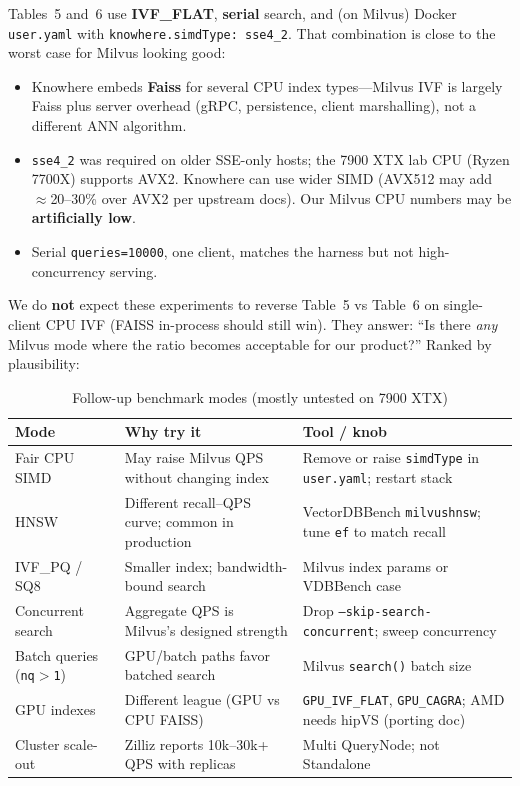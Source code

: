 \documentclass[11pt,a4paper]{article}
\begin{document}
Tables~5 and~6 use \textbf{IVF\_FLAT}, \textbf{serial} search, and (on Milvus) Docker
\texttt{user.yaml} with \texttt{knowhere.simdType: sse4\_2}. That combination is close to
the worst case for Milvus looking good:
\begin{itemize}[leftmargin=*]
  \item Knowhere embeds \textbf{Faiss} for several CPU index types---Milvus IVF is largely
        Faiss plus server overhead (gRPC, persistence, client marshalling), not a different
        ANN algorithm.
  \item \texttt{sse4\_2} was required on older SSE-only hosts; the 7900 XTX lab CPU (Ryzen
        7700X) supports AVX2. Knowhere can use wider SIMD (AVX512 may add $\approx$20--30\%
        over AVX2 per upstream docs). Our Milvus CPU numbers may be \textbf{artificially low}.
  \item Serial \texttt{queries=10000}, one client, matches the harness but not high-concurrency
        serving.
\end{itemize}

We do \textbf{not} expect these experiments to reverse Table~5 vs Table~6 on single-client
CPU IVF (FAISS in-process should still win). They answer: ``Is there \emph{any} Milvus mode
where the ratio becomes acceptable for our product?'' Ranked by plausibility:

\begin{table}[h]
\centering
\caption{Follow-up benchmark modes (mostly untested on 7900 XTX)}
\begin{tabular}{@{}p{}p{}p{}@{}}
\toprule
\textbf{Mode} & \textbf{Why try it} & \textbf{Tool / knob} \\
\midrule
Fair CPU SIMD & May raise Milvus QPS without changing index & Remove or raise \texttt{simdType} in \texttt{user.yaml}; restart stack \\
HNSW & Different recall--QPS curve; common in production & VectorDBBench \texttt{milvushnsw}; tune \texttt{ef} to match recall \\
IVF\_PQ / SQ8 & Smaller index; bandwidth-bound search & Milvus index params or VDBBench case \\
Concurrent search & Aggregate QPS is Milvus's designed strength & Drop \texttt{--skip-search-concurrent}; sweep concurrency \\
Batch queries (\texttt{nq$>$1}) & GPU/batch paths favor batched search & Milvus \texttt{search()} batch size \\
GPU indexes & Different league (GPU vs CPU FAISS) & \texttt{GPU\_IVF\_FLAT}, \texttt{GPU\_CAGRA}; AMD needs hipVS (porting doc) \\
Cluster scale-out & Zilliz reports 10k--30k+ QPS with replicas & Multi QueryNode; not Standalone \\
\bottomrule
\end{tabular}
\end{table}
\end{document}
